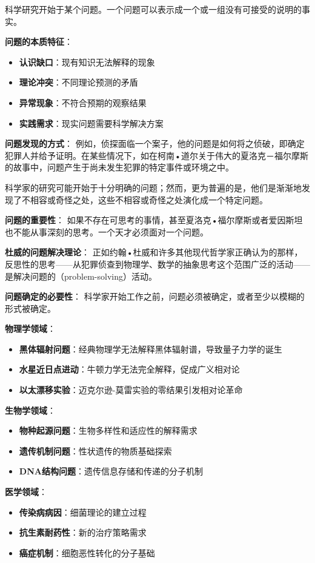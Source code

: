 \begin{theorembox}[title=问题确定的认识论分析]
科学研究开始于某个问题。一个问题可以表示成一个或一组没有可接受的说明的事实。

\textbf{问题的本质特征}：
\begin{itemize}
\item \textbf{认识缺口}：现有知识无法解释的现象
\item \textbf{理论冲突}：不同理论预测的矛盾
\item \textbf{异常现象}：不符合预期的观察结果
\item \textbf{实践需求}：现实问题需要科学解决方案
\end{itemize}

\textbf{问题发现的方式}：
例如，侦探面临一个案子，他的问题是如何将之侦破，即确定犯罪人并给予证明。在某些情况下，如在柯南•道尔关于伟大的夏洛克－福尔摩斯的故事中，问题产生于尚未发生犯罪的特定事件或环境之中。

科学家的研究可能开始于十分明确的问题；然而，更为普遍的是，他们是渐渐地发现了不相容或奇怪之处，这些不相容或奇怪之处演化成一个特定问题。

\textbf{问题的重要性}：
如果不存在可思考的事情，甚至夏洛克•福尔摩斯或者爱因斯坦也不能从事深刻的思考。一个天才必须面对一个问题。

\textbf{杜威的问题解决理论}：
正如约翰•杜威和许多其他现代哲学家正确认为的那样，反思性的思考——从犯罪侦查到物理学、数学的抽象思考这个范围广泛的活动——是解决问题的（problem-solving）活动。

\textbf{问题确定的必要性}：
科学家开始工作之前，问题必须被确定，或者至少以模糊的形式被确定。
\end{theorembox}

\begin{examplebox}[title=科学史上的重大问题确定实例]
\textbf{物理学领域}：
\begin{itemize}
\item \textbf{黑体辐射问题}：经典物理学无法解释黑体辐射谱，导致量子力学的诞生
\item \textbf{水星近日点进动}：牛顿力学无法完全解释，促成广义相对论
\item \textbf{以太漂移实验}：迈克尔逊-莫雷实验的零结果引发相对论革命
\end{itemize}

\textbf{生物学领域}：
\begin{itemize}
\item \textbf{物种起源问题}：生物多样性和适应性的解释需求
\item \textbf{遗传机制问题}：性状遗传的物质基础探索
\item \textbf{DNA结构问题}：遗传信息存储和传递的分子机制
\end{itemize}

\textbf{医学领域}：
\begin{itemize}
\item \textbf{传染病病因}：细菌理论的建立过程
\item \textbf{抗生素耐药性}：新的治疗策略需求
\item \textbf{癌症机制}：细胞恶性转化的分子基础
\end{itemize}
\end{examplebox}

